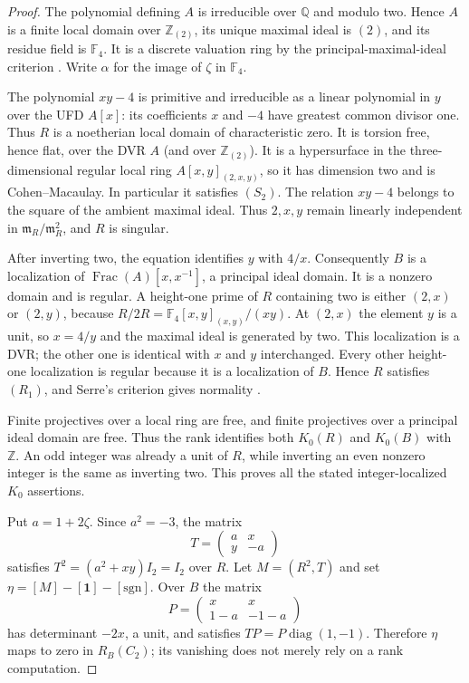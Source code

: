 \begin{proof}
The polynomial defining $A$ is irreducible over $\mathbb Q$
and modulo two. Hence $A$ is a finite local domain over
$\mathbb Z_{(2)}$, its unique maximal ideal is $(2)$,
and its residue field is $\mathbb F_4$.
It is a discrete valuation ring by the principal-maximal-ideal
criterion \cite[Lemma 10.119.7, Tag 00PD]{C-NormalKernelStacks}.
Write $\alpha$ for the image of $\zeta$ in $\mathbb F_4$.

The polynomial $xy-4$ is primitive and irreducible as a
linear polynomial in $y$ over the UFD $A[x]$: its coefficients
$x$ and $-4$ have greatest common divisor one.
Thus $R$ is a noetherian local domain of characteristic zero.
It is torsion free, hence flat, over the DVR $A$ (and over
$\mathbb Z_{(2)}$). It is a hypersurface in the three-dimensional
regular local ring $A[x,y]_{(2,x,y)}$, so it has dimension two
and is Cohen--Macaulay. In particular it satisfies $(S_2)$.
The relation $xy-4$ belongs to the square of the ambient
maximal ideal. Thus $2,x,y$ remain linearly independent in
$\mathfrak m_R/\mathfrak m_R^2$, and $R$ is singular.

After inverting two, the equation identifies $y$ with $4/x$.
Consequently $B$ is a localization of
$\operatorname{Frac}(A)[x,x^{-1}]$, a principal ideal domain.
It is a nonzero domain and is regular. A height-one prime of
$R$ containing two is either $(2,x)$ or $(2,y)$, because
$R/2R=\mathbb F_4[x,y]_{(x,y)}/(xy)$.
At $(2,x)$ the element $y$ is a unit, so $x=4/y$ and the
maximal ideal is generated by two. This localization is a DVR;
the other one is identical with $x$ and $y$ interchanged.
Every other height-one localization is regular because it
is a localization of $B$. Hence $R$ satisfies $(R_1)$, and
Serre's criterion gives normality
\cite[Lemma 10.157.4, Tag 031S]{C-NormalKernelStacks}.

Finite projectives over a local ring are free, and finite
projectives over a principal ideal domain are free. Thus the
rank identifies both $K_0(R)$ and $K_0(B)$ with $\mathbb Z$.
An odd integer was already a unit of $R$, while inverting an
even nonzero integer is the same as inverting two. This proves
all the stated integer-localized $K_0$ assertions.

Put $a=1+2\zeta$. Since $a^2=-3$, the matrix
\[
 T=\begin{pmatrix}a&x\\y&-a\end{pmatrix}               \tag{C.1.N4}
\]
satisfies $T^2=(a^2+xy)I_2=I_2$ over $R$.
Let $M=(R^2,T)$ and set
$\eta=[M]-[\mathbf1]-[\mathrm{sgn}]$.
Over $B$ the matrix
\[
 P=\begin{pmatrix}x&x\\1-a&-1-a\end{pmatrix}
\]
has determinant $-2x$, a unit, and satisfies
$TP=P\operatorname{diag}(1,-1)$. Therefore $\eta$ maps to
zero in $R_B(C_2)$; its vanishing does not merely rely on a
rank computation.


\end{proof}
